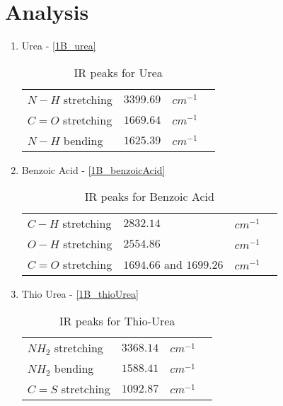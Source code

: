 \section{Analysis}
	\begin{enumerate}
		\item Urea - \autoref{1B_urea}
			\begin{table}
				\myfloatalign
				\begin{tabularx}{\textwidth}{Xlll}
					\hline%
					$N-H$ stretching					& 	$3399.69$	& 	$cm^{-1}$\\
					$C=O$ stretching					& 	$1669.64$	& 	$cm^{-1}$\\
					$N-H$ bending						& 	$1625.39$	&	$cm^{-1}$\\
					\hline%
				\end{tabularx}
				\caption{IR peaks for Urea}
				\label{1B_urea}
			\end{table}
		\item Benzoic Acid - \autoref{1B_benzoicAcid}
			\begin{table}
				\myfloatalign
				\begin{tabularx}{\textwidth}{Xlll}
					\hline%
					$C-H$ stretching					&	$2832.14$				& 	$cm^{-1}$\\
					$O-H$ stretching					&	$2554.86$				& 	$cm^{-1}$\\
					$C=O$ stretching					&	$1694.66$ and $1699.26$	& 	$cm^{-1}$\\
					\hline%
				\end{tabularx}
				\caption{IR peaks for Benzoic Acid}
				\label{1B_benzoicAcid}
			\end{table}

		\item Thio Urea - \autoref{1B_thioUrea}
			\begin{table}
				\myfloatalign
				\begin{tabularx}{\textwidth}{Xlll}
					\hline%
					$NH_{2}$ stretching					&	$3368.14$				& 	$cm^{-1}$\\
					$NH_{2}$ bending					&	$1588.41$				& 	$cm^{-1}$\\
					$C=S$ stretching					&	$1092.87$				& 	$cm^{-1}$\\
					\hline%
				\end{tabularx}
				\caption{IR peaks for Thio-Urea}
				\label{1B_thioUrea}
			\end{table}


\end{enumerate}
